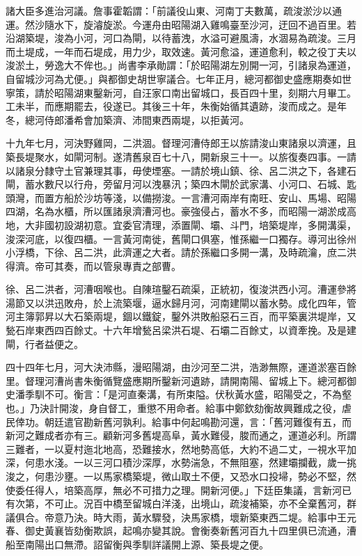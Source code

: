 諸大臣多進治河議。詹事霍韜謂：「前議役山東、河南丁夫數萬，疏浚淤沙以通運。然沙隨水下，旋濬旋淤。今運舟由昭陽湖入雞鳴臺至沙河，迂回不過百里。若沿湖築堤，浚為小河，河口為閘，以待蓄洩，水溢可避風濤，水涸易為疏浚。三月而土堤成，一年而石堤成，用力少，取效速。黃河愈溢，運道愈利，較之役丁夫以浚淤土，勞逸大不侔也。」尚書李承勛謂：「於昭陽湖左別開一河，引諸泉為運道，自留城沙河為尤便。」與都御史胡世寧議合。七年正月，總河都御史盛應期奏如世寧策，請於昭陽湖東鑿新河，自汪家口南出留城口，長百四十里，刻期六月畢工。工未半，而應期罷去，役遂已。其後三十年，朱衡始循其遺跡，浚而成之。是年冬，總河侍郎潘希會加築濟、沛間東西兩堤，以拒黃河。

十九年七月，河決野雞岡，二洪涸。督理河漕侍郎王以旂請浚山東諸泉以濟運，且築長堤聚水，如閘河制。遂清舊泉百七十八，開新泉三十一。以旂復奏四事。一請以諸泉分隸守土官兼理其事，毋使堙塞。一請於境山鎮、徐、呂二洪之下，各建石閘，蓄水數尺以行舟，旁留月河以洩暴汛；築四木閘於武家溝、小河口、石城、匙頭灣，而置方船於沙坊等淺，以備撈浚。一言漕河兩岸有南旺、安山、馬場、昭陽四湖，名為水櫃，所以匯諸泉濟漕河也。豪強侵占，蓄水不多，而昭陽一湖淤成高地，大非國初設湖初意。宜委官清理，添置閘、壩、斗門，培築堤岸，多開溝渠，浚深河底，以復四櫃。一言黃河南徙，舊閘口俱塞，惟孫繼一口獨存。導河出徐州小浮橋，下徐、呂二洪，此濟運之大者。請於孫繼口多開一溝，及時疏瀹，庶二洪得濟。帝可其奏，而以管泉專責之部曹。

徐、呂二洪者，河漕咽喉也。自陳瑄鑿石疏渠，正統初，復浚洪西小河。漕運參將湯節又以洪迅敗舟，於上流築堰，逼水歸月河，河南建閘以蓄水勢。成化四年，管河主簿郭昇以大石築兩堤，錮以鐵錠，鑿外洪敗船惡石三百，而平築裏洪堤岸，又甃石岸東西四百餘丈。十六年增甃呂梁洪石堤、石壩二百餘丈，以資牽挽。及是建閘，行者益便之。

四十四年七月，河大決沛縣，漫昭陽湖，由沙河至二洪，浩渺無際，運道淤塞百餘里。督理河漕尚書朱衡循覽盛應期所鑿新河遺跡，請開南陽、留城上下。總河都御史潘季馴不可。衡言：「是河直秦溝，有所束隘。伏秋黃水盛，昭陽受之，不為壑也。」乃決計開浚，身自督工，重懲不用命者。給事中鄭欽劾衡故興難成之役，虐民倖功。朝廷遣官勘新舊河孰利。給事中何起鳴勘河還，言：「舊河難復有五，而新河之難成者亦有三。顧新河多舊堤高阜，黃水難侵，脧而通之，運道必利。所謂三難者，一以夏村迤北地高，恐難接水，然地勢高低，大約不過二丈，一視水平加深，何患水淺。一以三河口積沙深厚，水勢湍急，不無阻塞，然建壩攔截，歲一挑浚之，何患沙壅。一以馬家橋築堤，微山取土不便，又恐水口投埽，勢必不堅，然使委任得人，培築高厚，無必不可措力之理。開新河便。」下廷臣集議，言新河已有次第，不可止。況百中橋至留城白洋淺，出境山，疏浚補築，亦不全棄舊河，群議俱合。帝意乃決。時大雨，黃水驟發，決馬家橋，壞新築東西二堤。給事中王元春、御史黃襄皆劾衡欺誤，起鳴亦變其說。會衡奏新舊河百九十四里俱已流通，漕船至南陽出口無滯。詔留衡與季馴詳議開上源、築長堤之便。

